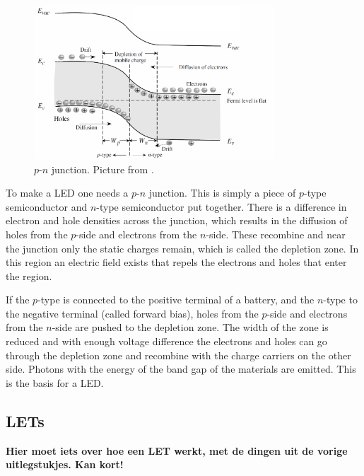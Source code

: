 \begin{figure}[!ht]
 \begin{center}
  \includegraphics[width=0.8\textwidth]{pn_junction}
  \caption{$p$-$n$ junction. Picture from \citet{vanweesbook}.}
  \label{fig:pn_junction}
 \end{center}
\end{figure}

To make a LED one needs a $p$-$n$ junction. This is simply a piece of $p$-type semiconductor and $n$-type semiconductor put together. There is a difference in electron and hole densities across the junction, which results in the diffusion of holes from the $p$-side and electrons from the $n$-side. These recombine and near the junction only the static charges remain, which is called the depletion zone. In this region an electric field exists that repels the electrons and holes that enter the region.

If the $p$-type is connected to the positive terminal of a battery, and the $n$-type to the negative terminal (called forward bias), holes from the $p$-side and electrons from the $n$-side are pushed to the depletion zone. The width of the zone is reduced and with enough voltage difference the electrons and holes can go through the depletion zone and recombine with the charge carriers on the other side. Photons with the energy of the band gap of the materials are emitted. This is the basis for a LED.

\subsection{LETs}

\textbf{Hier moet iets over hoe een LET werkt, met de dingen uit de vorige uitlegstukjes. Kan kort!}

